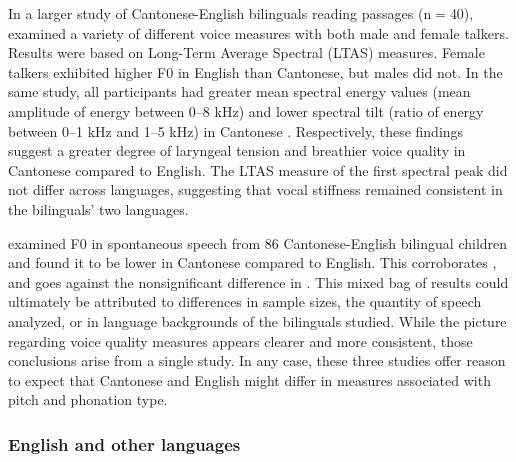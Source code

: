 In a larger study of Cantonese-English bilinguals reading passages (n$=$40), \citet{ng_2012_ltas} examined a variety of different voice measures with both male and female talkers. Results were based on Long-Term Average Spectral (LTAS) measures. Female talkers exhibited higher F0 in English than Cantonese, but males did not. In the same study, all participants had greater mean spectral energy values (mean amplitude of energy between 0--8 kHz) and lower spectral tilt (ratio of energy between 0--1 kHz and 1--5 kHz) in Cantonese \citep{ng_2012_ltas}. Respectively, these findings suggest a greater degree of laryngeal tension and breathier voice quality in Cantonese compared to English. The LTAS measure of the first spectral peak did not differ across languages, suggesting that vocal stiffness remained consistent in the bilinguals' two languages. 

\citet{ng_2010_voice} examined F0 in spontaneous speech from 86 Cantonese-English bilingual children and found it to be lower in Cantonese compared to English. This corroborates \citet{ng_2012_ltas}, and goes against the nonsignificant difference in \citep{altenberg_2006_f0}. This mixed bag of results could ultimately be attributed to differences in sample sizes, the quantity of speech analyzed, or in language backgrounds of the bilinguals studied. While the picture regarding voice quality measures appears clearer and more consistent, those conclusions arise from a single study. In any case, these three studies offer reason to expect that Cantonese and English might differ in measures associated with pitch and phonation type. 

\subsubsection{English and other languages}


